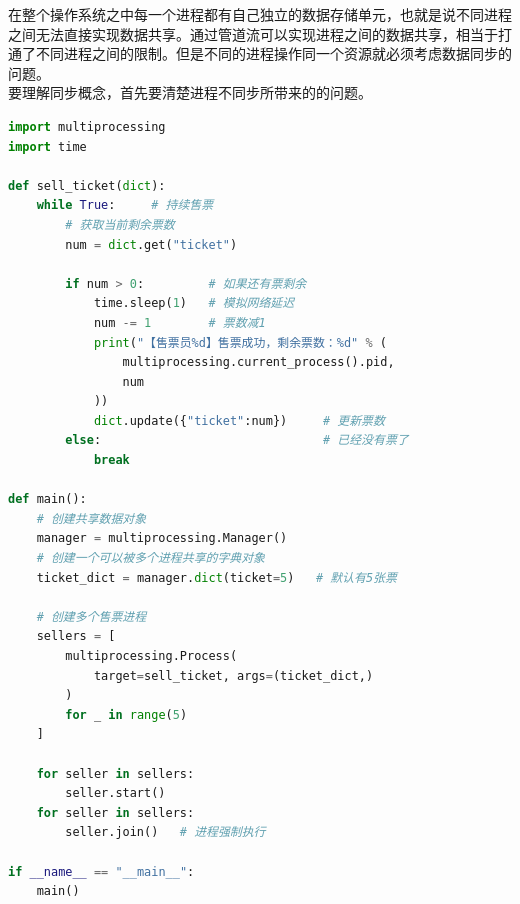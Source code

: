 在整个操作系统之中每一个进程都有自己独立的数据存储单元，也就是说不同进程之间无法直接实现数据共享。通过管道流可以实现进程之间的数据共享，相当于打通了不同进程之间的限制。但是不同的进程操作同一个资源就必须考虑数据同步的问题。 \\

要理解同步概念，首先要清楚进程不同步所带来的的问题。

\begin{lstlisting}[language=Python, title=售票操作（Bug版本）]
import multiprocessing
import time

def sell_ticket(dict):
	while True:     # 持续售票
		# 获取当前剩余票数
		num = dict.get("ticket")
		
		if num > 0:         # 如果还有票剩余
			time.sleep(1)   # 模拟网络延迟
			num -= 1        # 票数减1
			print("【售票员%d】售票成功，剩余票数：%d" % (
				multiprocessing.current_process().pid,
				num
			))
			dict.update({"ticket":num})     # 更新票数
		else:                				# 已经没有票了
			break

def main():
	# 创建共享数据对象
	manager = multiprocessing.Manager()
	# 创建一个可以被多个进程共享的字典对象
	ticket_dict = manager.dict(ticket=5)   # 默认有5张票

	# 创建多个售票进程
	sellers = [
		multiprocessing.Process(
			target=sell_ticket, args=(ticket_dict,)
		) 
		for _ in range(5)
	]

	for seller in sellers:
		seller.start()
	for seller in sellers:
		seller.join()   # 进程强制执行

if __name__ == "__main__":
	main()
\end{lstlisting}

